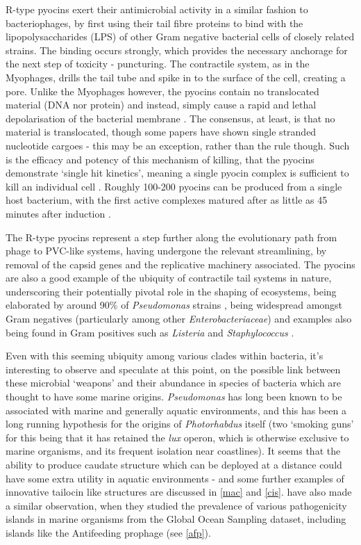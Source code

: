R-type pyocins exert their antimicrobial activity in a similar fashion to bacteriophages, by first using their tail fibre proteins to bind with the lipopolysaccharides (LPS) of other Gram negative bacterial cells of closely related strains. The binding occurs strongly, which provides the necessary anchorage for the next step of toxicity - puncturing. The contractile system, as in the Myophages, drills the tail tube and spike in to the surface of the cell, creating a pore. Unlike the Myophages however, the pyocins contain no translocated material (DNA nor protein) and instead, simply cause a rapid and lethal depolarisation of the bacterial membrane \citep{Uratani1984}. The consensus, at least, is that no material is translocated, though some papers have shown single stranded nucleotide cargoes \citep{Lee1999} - this may be an exception, rather than the rule though. Such is the efficacy and potency of this mechanism of killing, that the pyocins demonstrate `single hit kinetics', meaning a single pyocin complex is sufficient to kill an individual cell \citep{OHKAWA1973}. Roughly 100-200 pyocins can be produced from a single host bacterium, with the first active complexes matured after as little as 45 minutes after induction \citep{Michel-Briand2002, Shinomiya1972, Scholl2008}.

The R-type pyocins represent a step further along the evolutionary path from phage to PVC-like systems, having undergone the relevant streamlining, by removal of the capsid genes and the replicative machinery associated. The pyocins are also a good example of the ubiquity of contractile tail systems in nature, underscoring their potentially pivotal role in the shaping of ecosystems, being elaborated by around 90\% of \emph{Pseudomonas} strains \citep{Michel-Briand2002}, being widespread amongst Gram negatives (particularly among other \emph{Enterobacteriaceae}) \citep{Coetzee1968} and examples also being found in Gram positives such as \emph{Listeria} \citep{Zink1995} and \emph{Staphylococcus} \citep{Birmingham1981, Scholl2008}. 

Even with this seeming ubiquity among various clades within bacteria, it's interesting to observe and speculate at this point, on the possible link between these microbial `weapons' and their abundance in species of bacteria which are thought to have some marine origins. \emph{Pseudomonas} has long been known to be associated with marine and generally aquatic environments, and this has been a long running hypothesis for the origins of \emph{Photorhabdus} itself (two `smoking guns' for this being that it has retained the \emph{lux} operon, which is otherwise exclusive to marine organisms, and its frequent isolation near coastlines). It seems that the ability to produce caudate structure which can be deployed at a distance could have some extra utility in aquatic environments - and some further examples of innovative tailocin like structures are discussed in \vref{mac} and \vref{cis}. \cite{Persson2009} have also made a similar observation, when they studied the prevalence of various pathogenicity islands in marine organisms from the Global Ocean Sampling dataset, including islands like the Antifeeding prophage (see \vref{afp}).

